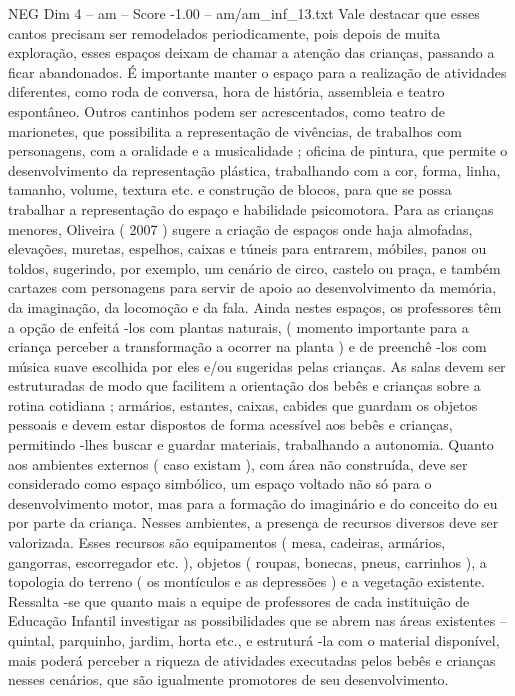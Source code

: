 \begin{textsample}{NEG Dim 4 – am – Score -1.00 – am/am\_inf\_13.txt}
Vale destacar que esses cantos precisam ser remodelados periodicamente, pois depois de muita exploração, esses espaços deixam de chamar a atenção das crianças, passando a ficar abandonados.
É importante manter o espaço para a realização de atividades diferentes, como roda de conversa, hora de história, assembleia e teatro espontâneo.
Outros cantinhos podem ser acrescentados, como teatro de marionetes, que possibilita a representação de vivências, de trabalhos com personagens, com a oralidade e a musicalidade ; oficina de pintura, que permite o desenvolvimento da representação plástica, trabalhando com a cor, forma, linha, tamanho, volume, textura etc. e construção de blocos, para que se possa trabalhar a representação do espaço e habilidade psicomotora.
Para as crianças menores, Oliveira ( 2007 ) sugere a criação de espaços onde haja almofadas, elevações, muretas, espelhos, caixas e túneis para entrarem, móbiles, panos ou toldos, sugerindo, por exemplo, um cenário de circo, castelo ou praça, e também cartazes com personagens para servir de apoio ao desenvolvimento da memória, da imaginação, da locomoção e da fala.
Ainda nestes espaços, os professores têm a opção de enfeitá -los com plantas naturais, ( momento importante para a criança perceber a transformação a ocorrer na planta ) e de preenchê -los com música suave escolhida por eles e/ou sugeridas pelas crianças.
As salas devem ser estruturadas de modo que facilitem a orientação dos bebês e crianças sobre a rotina cotidiana ; armários, estantes, caixas, cabides que guardam os objetos pessoais e devem estar dispostos de forma acessível aos bebês e crianças, permitindo -lhes buscar e guardar materiais, trabalhando a autonomia.
Quanto aos ambientes externos ( caso existam ), com área não construída, deve ser considerado como espaço simbólico, um espaço voltado não só para o desenvolvimento motor, mas para a formação do imaginário e do conceito do eu por parte da criança.
Nesses ambientes, a presença de recursos diversos deve ser valorizada.
Esses recursos são equipamentos ( mesa, cadeiras, armários, gangorras, escorregador etc. ), objetos ( roupas, bonecas, pneus, carrinhos ), a topologia do terreno ( os montículos e as depressões ) e a vegetação existente.
Ressalta -se que quanto mais a equipe de professores de cada instituição de Educação Infantil investigar as possibilidades que se abrem nas áreas existentes – quintal, parquinho, jardim, horta etc., e estruturá -la com o material disponível, mais poderá perceber a riqueza de atividades executadas pelos bebês e crianças nesses cenários, que são igualmente promotores de seu desenvolvimento.

\end{textsample}

